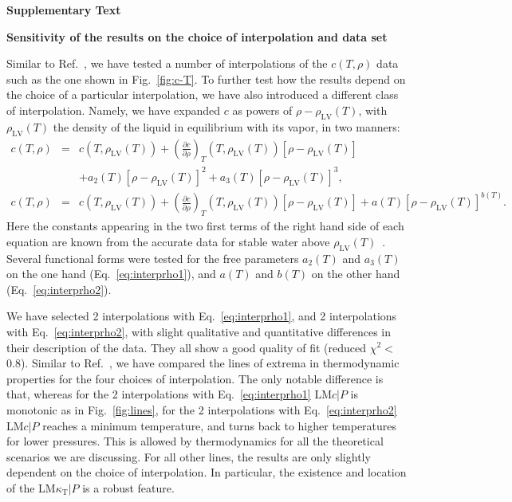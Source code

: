 \documentclass[12pt]{article}
\newcommand{\mrm}{\mathrm}
\newcommand{\kT}{\kappa_\mrm{T}}
\newcommand{\rhoLV}{\rho_\mrm{LV}}
\begin{document}
\textbf{Supplementary Text}

\textbf{Sensitivity of the results on the choice of interpolation and data set}

Similar to Ref.~\cite{Pallares_equation_2016}, we have tested a number of interpolations of the $c(T,\rho)$ data such as the one shown in Fig.~\ref{fig:c-T}. To further test how the results depend on the choice of a particular interpolation, we have also introduced a different class of interpolation. Namely, we have expanded $c$ as powers of $\rho-\rhoLV(T)$, with $\rhoLV(T)$ the density of the liquid in equilibrium with its vapor, in two manners:
\begin{eqnarray}
c(T,\rho) &=& c(T,\rhoLV(T)) + \left(\frac{\partial c}{\partial \rho} \right)_T \!(T,\rhoLV(T)) [ \rho-\rhoLV(T) ]\nonumber \\
& & + a_2 (T) [ \rho-\rhoLV(T) ]^2 + a_3 (T) [ \rho-\rhoLV(T) ]^3 , \label{eq:interprho1}\\ 
c(T,\rho) &=& c(T,\rhoLV(T)) + \left(\frac{\partial c}{\partial \rho} \right)_T \!(T,\rhoLV(T)) [ \rho-\rhoLV(T) ] + a(T) [ \rho-\rhoLV(T) ]^{b(T)} .\label{eq:interprho2}
\end{eqnarray}
Here the constants appearing in the two first terms of the right hand side of each equation are known from the accurate data for stable water above $\rhoLV(T)$~\cite{Wagner_IAPWS_2002}. Several functional forms were tested for the free parameters $a_2(T)$ and $a_3(T)$ on the one hand (Eq.~\ref{eq:interprho1}), and $a(T)$ and $b(T)$ on the other hand (Eq.~\ref{eq:interprho2}).

We have selected 2 interpolations with Eq.~\ref{eq:interprho1}, and 2 interpolations with Eq.~\ref{eq:interprho2}, with slight qualitative and quantitative differences in their description of the data. They all show a good quality of fit (reduced $\chi^2<$0.8). Similar to Ref.~\cite{Pallares_equation_2016}, we have compared the lines of extrema in thermodynamic properties for the four choices of interpolation. The only notable difference is that, whereas for the 2 interpolations with Eq.~\ref{eq:interprho1} LM$c|P$ is monotonic as in Fig.~\ref{fig:lines}, for the 2 interpolations with Eq.~\ref{eq:interprho2} LM$c|P$ reaches a minimum temperature, and turns back to higher temperatures for lower pressures. This is allowed by thermodynamics for all the theoretical scenarios we are discussing. For all other lines, the results are only slightly dependent on the choice of interpolation. In particular, the existence and location of the LM$\kT|P$ is a robust feature.
\end{document}
